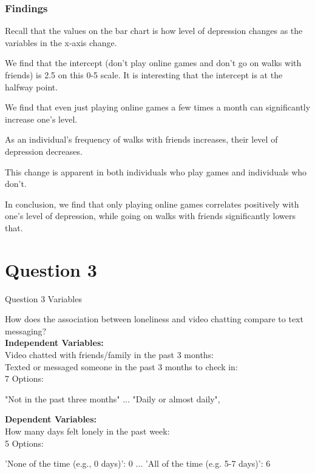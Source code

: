 \documentclass{beamer}
\begin{document}
\begin{frame}
    \frametitle{Findings}

    Recall that the values on the bar chart is how level of depression changes as the variables in the x-axis change.

    We find that the intercept (don't play online games and don't go on walks with friends) is 2.5 on this 0-5 scale. It is interesting that the intercept is at the halfway point.
    
    We find that even just playing online games a few times a month can significantly increase one's level.

    As an individual's frequency of walks with friends increases, their level of depression decreases.

    This change is apparent in both individuals who play games and individuals who don't.

    In conclusion, we find that only playing online games correlates positively with one's level of depression, while going on walks with friends significantly lowers that.

\end{frame}






\section{Question 3}
\begin{frame}{Question 3 Variables}

\small %
How does the association between loneliness and video chatting compare
to text messaging?\\

\vspace{0.5em} %
\textbf{Independent Variables:}\\
\vspace{0.2em}
Video chatted with friends/family in the past 3 months:\\
Texted or messaged someone in the past 3 months to check in:\\

\vspace{0.5em}
7 Options:
\begin{itemize}
    "Not in the past three months" ...
    "Daily or almost daily",
\end{itemize}

\vspace{0.5em}
\textbf{Dependent Variables:}\\
\vspace{0.2em}
How many days felt lonely in the past week:\\

\vspace{0.5em}
5 Options:
\begin{itemize}
    'None of the time (e.g., 0 days)': 0 ... 'All of the time (e.g. 5-7 days)': 6
\end{itemize}

\end{frame}
\end{document}

